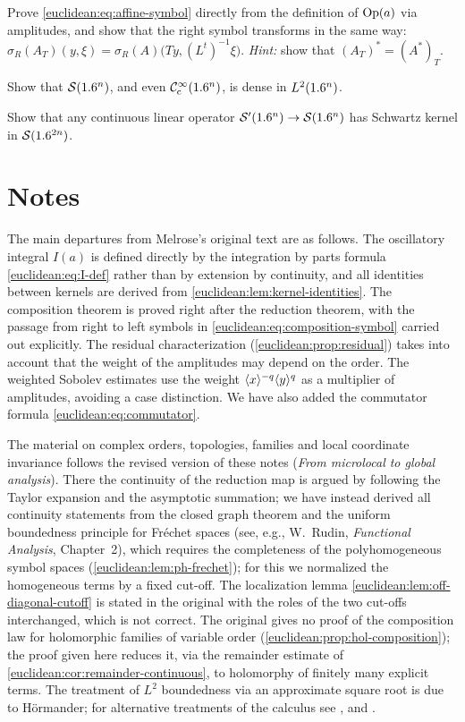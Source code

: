 \begin{exercise}\label{euclidean:ex:affine}
  Prove \eqref{euclidean:eq:affine-symbol} directly from the definition of
  $\operatorname{Op}(a)$ via amplitudes, and show that the right symbol transforms in the
  same way:
  $\sigma_R(A_T)(y,\xi)=\sigma_R(A)\bigl(Ty,(L^t)^{-1}\xi\bigr)$.
  \emph{Hint:} show that $(A_T)^*=(A^*)_T$.
\end{exercise}

\begin{exercise}\label{euclidean:ex:density-L2}
  Show that $\mathcal{S}(1.6^n)$, and even $\mathcal{C}^\infty_{\mathrm{c}}(1.6^n)$, is dense in $L^2(1.6^n)$.
\end{exercise}

\begin{exercise}\label{euclidean:ex:S'-to-S}
  Show that any continuous linear operator $\mathcal{S}'(1.6^n)\to\mathcal{S}(1.6^n)$ has
  Schwartz kernel in $\mathcal{S}(1.6^{2n})$.
\end{exercise}

\section*{Notes}

The main departures from Melrose's original text are as follows. The
oscillatory integral $I(a)$ is defined directly by the integration by parts
formula \eqref{euclidean:eq:I-def} rather than by extension by continuity, and
all identities between kernels are derived from
\cref{euclidean:lem:kernel-identities}. The composition theorem is proved
right after the reduction theorem, with the passage from right to left
symbols in \eqref{euclidean:eq:composition-symbol} carried out explicitly.
The residual characterization (\cref{euclidean:prop:residual}) takes into
account that the weight of the amplitudes may depend on the order. The
weighted Sobolev estimates use the weight $\langle x\rangle^{-q}\langle y\rangle^q$ as a
multiplier of amplitudes, avoiding a case distinction. We have also added the
commutator formula \eqref{euclidean:eq:commutator}.

The material on complex orders, topologies, families and local coordinate
invariance follows the revised version of these notes (\emph{From
microlocal to global analysis}). There the continuity of the reduction map is
argued by following the Taylor expansion and the asymptotic summation; we
have instead derived all continuity statements from the closed graph
theorem and the uniform boundedness principle for Fr\'echet spaces (see,
e.g., W.~Rudin, \emph{Functional Analysis}, Chapter~2),
which requires the completeness of the polyhomogeneous symbol spaces
(\cref{euclidean:lem:ph-frechet}); for this we normalized the homogeneous
terms by a fixed cut-off. The localization lemma
\cref{euclidean:lem:off-diagonal-cutoff} is stated in the original with the
roles of the two cut-offs interchanged, which is not correct. The original
gives no proof of the composition law for holomorphic families of variable
order (\cref{euclidean:prop:hol-composition}); the proof given here reduces
it, via the remainder estimate of \cref{euclidean:cor:remainder-continuous},
to holomorphy of finitely many explicit terms. The treatment of
$L^2$ boundedness via an approximate square root is due to H\"ormander; for
alternative treatments of the calculus see \cite{Hormander-III},
\cite{Shubin} and \cite{Seeley}.
